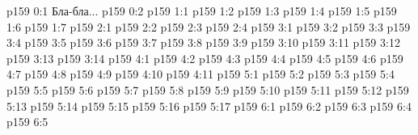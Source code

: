 \author{Промежуточные создания}
\vs p159 0:1  Бла-бла...
\vs p159 0:2 
\vs p159 1:1 
\vs p159 1:2 \pc 
\vs p159 1:3 
\vs p159 1:4 \pc 
\vs p159 1:5 
\vs p159 1:6 \pc 
\vs p159 1:7 \pc 
{}
\vs p159 2:1 
\vs p159 2:2 
\vs p159 2:3 
\vs p159 2:4 
\vs p159 3:1 
\vs p159 3:2 \pc 
\vs p159 3:3 
\vs p159 3:4 
\vs p159 3:5 
\vs p159 3:6 
\vs p159 3:7 
\vs p159 3:8 
\vs p159 3:9 
\vs p159 3:10 
\vs p159 3:11 
\vs p159 3:12 \pc 
\vs p159 3:13 
\vs p159 3:14 \pc 
{}
\vs p159 4:1 
\vs p159 4:2 \pc 
\vs p159 4:3 
\vs p159 4:4 
\vs p159 4:5 
\vs p159 4:6 
\vs p159 4:7 
\vs p159 4:8 
\vs p159 4:9 
\vs p159 4:10 
\vs p159 4:11 \pc 
{}
\vs p159 5:1 
\vs p159 5:2 
\vs p159 5:3 \pc 
\vs p159 5:4 \pc 
\vs p159 5:5 \pc 
\vs p159 5:6 \pc 
\vs p159 5:7 \pc 
\vs p159 5:8 
\vs p159 5:9 
\vs p159 5:10 
\vs p159 5:11 
\vs p159 5:12 
\vs p159 5:13 
\vs p159 5:14 
\vs p159 5:15 \pc 
\vs p159 5:16 
\vs p159 5:17 
\vs p159 6:1 
\vs p159 6:2 
\vs p159 6:3 
\vs p159 6:4 
\vs p159 6:5 
\quizlink
